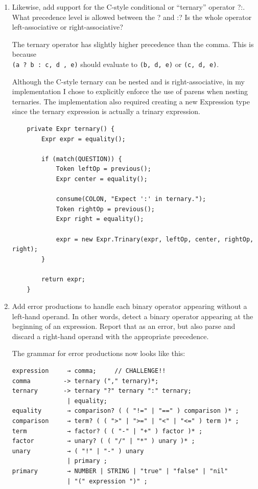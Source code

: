 \documentclass{article}
\begin{document}
\begin{enumerate}
\begin{lstlisting}
    private Expr comma() {
        Expr expr = equality();

        while (match(COMMA)) {
            Token op = previous();
            Expr right = equality();
            expr = new Expr.Binary(expr, op, right);
        }
        return expr;
    }
        \end{lstlisting}


        \item 
            Likewise, add support for the C-style conditional or “ternary” operator ?:. What precedence level is allowed between the ? and :? Is the whole operator left-associative or right-associative?

            The ternary operator has slightly higher precedence than the comma.
            This is because \\ \verb|(a ? b : c, d , e)| should evaluate to 
            \verb|(b, d, e)| or \verb|(c, d, e)|.

            Although the C-style ternary can be nested and is right-associative,
            in my implementation I chose to explicitly enforce the use of parens 
            when nesting ternaries. The implementation also required creating 
            a new Expression type since the ternary expression is actually a 
            trinary expression.

            \begin{lstlisting}
    private Expr ternary() {
        Expr expr = equality();

        if (match(QUESTION)) {
            Token leftOp = previous();
            Expr center = equality();

            consume(COLON, "Expect ':' in ternary.");
            Token rightOp = previous();
            Expr right = equality();

            expr = new Expr.Trinary(expr, leftOp, center, rightOp, right);
        }

        return expr;
    }
            \end{lstlisting}

        \item 
            Add error productions to handle each binary operator appearing without a left-hand operand. In other words, detect a binary operator appearing at the beginning of an expression. Report that as an error, but also parse and discard a right-hand operand with the appropriate precedence.

            The grammar for error productions now looks like this:
            \begin{verbatim}
expression     → comma;     // CHALLENGE!!
comma         -> ternary ("," ternary)*;
ternary       -> ternary "?" ternary ":" ternary;
               | equality;
equality       → comparison? ( ( "!=" | "==" ) comparison )* ;
comparison     → term? ( ( ">" | ">=" | "<" | "<=" ) term )* ;
term           → factor? ( ( "-" | "+" ) factor )* ;
factor         → unary? ( ( "/" | "*" ) unary )* ;
unary          → ( "!" | "-" ) unary
               | primary ;
primary        → NUMBER | STRING | "true" | "false" | "nil"
               | "(" expression ")" ;
            \end{verbatim}


\end{enumerate}
\end{document}
